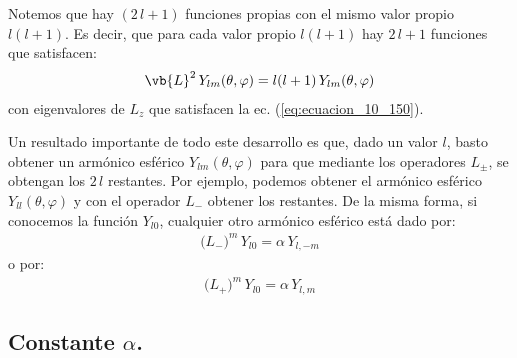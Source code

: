 Notemos que hay $(2 \, l + 1)$ funciones propias con el mismo valor propio $l (l + 1)$. Es decir, que para cada valor propio $l (l + 1)$ hay $2 \, l + 1$ funciones que satisfacen:
\begin{align*}
\vb{L}^{2} \, Y_{l m} (\theta, \varphi) = l (l + 1)\, Y_{l m} (\theta, \varphi)
\label{eq:ecuacion_10_151}
\end{align*}
con eigenvalores de $L_{z}$ que satisfacen la ec. (\ref{eq:ecuacion_10_150}).
\par
Un resultado importante de todo este desarrollo es que, dado un valor $l$, basto obtener un armónico esférico $Y_{lm} (\theta, \varphi)$ para que mediante los operadores $L_{\pm}$, se obtengan los $2 \, l$ restantes. Por ejemplo, podemos obtener el armónico esférico $Y_{l l} (\theta, \varphi)$ y con el operador $L_{-}$ obtener los restantes. De la misma forma, si conocemos la función $Y_{l 0}$, cualquier otro armónico esférico está dado por:
\begin{align}
\big( L_{-} \big)^{m} \, Y_{l 0} = \alpha \, Y_{l, -m}
\end{align}
o por:
\begin{align}
\big( L_{+} \big)^{m} \, Y_{l 0} = \alpha \, Y_{l, m}
\end{align}

\subsection{Constante \texorpdfstring{$\alpha$}{a}.}

